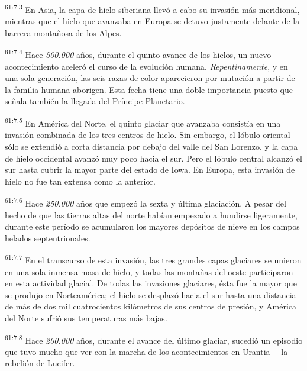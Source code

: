 \par
\textsuperscript{61:7.3} En Asia, la capa de hielo siberiana llevó a cabo su invasión más meridional, mientras que el hielo que avanzaba en Europa se detuvo justamente delante de la barrera montañosa de los Alpes.

\par
\textsuperscript{61:7.4} Hace \textit{500.000} años, durante el quinto avance de los hielos, un nuevo acontecimiento aceleró el curso de la evolución humana. \textit{Repentinamente}, y en una sola generación, las seis razas de color aparecieron por mutación a partir de la familia humana aborigen. Esta fecha tiene una doble importancia puesto que señala también la llegada del Príncipe Planetario.

\par
\textsuperscript{61:7.5} En América del Norte, el quinto glaciar que avanzaba consistía en una invasión combinada de los tres centros de hielo. Sin embargo, el lóbulo oriental sólo se extendió a corta distancia por debajo del valle del San Lorenzo, y la capa de hielo occidental avanzó muy poco hacia el sur. Pero el lóbulo central alcanzó el sur hasta cubrir la mayor parte del estado de Iowa. En Europa, esta invasión de hielo no fue tan extensa como la anterior.

\par
\textsuperscript{61:7.6} Hace \textit{250.000} años que empezó la sexta y última glaciación. A pesar del hecho de que las tierras altas del norte habían empezado a hundirse ligeramente, durante este período se acumularon los mayores depósitos de nieve en los campos helados septentrionales.

\par
\textsuperscript{61:7.7} En el transcurso de esta invasión, las tres grandes capas glaciares se unieron en una sola inmensa masa de hielo, y todas las montañas del oeste participaron en esta actividad glacial. De todas las invasiones glaciares, ésta fue la mayor que se produjo en Norteamérica; el hielo se desplazó hacia el sur hasta una distancia de más de dos mil cuatrocientos kilómetros de sus centros de presión, y América del Norte sufrió sus temperaturas más bajas.

\par
\textsuperscript{61:7.8} Hace \textit{200.000} años, durante el avance del último glaciar, sucedió un episodio que tuvo mucho que ver con la marcha de los acontecimientos en Urantia ---la rebelión de Lucifer.

